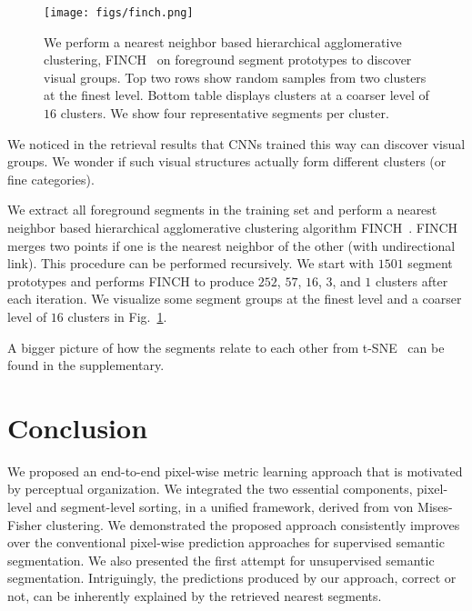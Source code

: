 \documentclass[10pt,twocolumn,letterpaper]{article}
\begin{document}
\begin{figure}
    \centering
    \texttt{[image: figs/finch.png]}
    \caption{We perform a nearest neighbor based hierarchical agglomerative clustering, FINCH~\cite{sarfraz2019efficient} on foreground segment prototypes to discover visual groups. Top two rows show random samples from two clusters at the finest level. Bottom table displays clusters at a coarser level of $16$ clusters. We show four representative segments per cluster. }
    \label{fig:finch}
    \vspace{-6pt}
\end{figure}


\vspace{-6pt}
We noticed in the retrieval results that CNNs trained this way can discover visual groups.
We wonder if such visual structures actually form different clusters (or fine categories).


We extract all foreground segments in the training set and perform a nearest neighbor based hierarchical agglomerative clustering algorithm FINCH~\cite{sarfraz2019efficient}.
FINCH merges two points if one is the nearest neighbor of the other (with undirectional link).
This procedure can be performed recursively.
We start with $1501$ segment prototypes and performs FINCH to produce $252$, $57$, $16$, $3$, and $1$ clusters after each iteration.
We visualize some segment groups at the finest level and a coarser level of $16$ clusters in Fig.~\ref{fig:finch}.


A bigger picture of how the segments relate to each other from t-SNE~\cite{maaten2008visualizing} can be found in the supplementary.







 
\section{Conclusion}
\label{sec:con}


We proposed an end-to-end pixel-wise metric learning approach that is motivated by perceptual organization.
We integrated the two essential components, pixel-level and segment-level sorting, in a unified framework, derived from von Mises-Fisher clustering.
We demonstrated the proposed approach consistently improves over the conventional pixel-wise prediction approaches for supervised semantic segmentation.
We also presented the first attempt for unsupervised semantic segmentation.
Intriguingly, the predictions produced by our approach, correct or not, can be inherently explained by the retrieved nearest segments. \\
\end{document}
